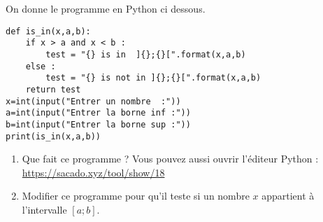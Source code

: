 
On donne le programme en Python ci dessous. 
 
\begin{lstlisting}
def is_in(x,a,b):
    if x > a and x < b :
    	test = "{} is in  ]{};{}[".format(x,a,b) 
    else :
        test = "{} is not in ]{};{}[".format(x,a,b) 
    return test    
x=int(input("Entrer un nombre  :")) 
a=int(input("Entrer la borne inf :"))
b=int(input("Entrer la borne sup :"))    
print(is_in(x,a,b))
\end{lstlisting}
 


\begin{enumerate}
\item Que fait ce programme ? Vous pouvez aussi ouvrir l'éditeur Python : \url{https://sacado.xyz/tool/show/18}
\item Modifier ce programme pour qu'il teste si un nombre $x$ appartient à l'intervalle $[a;b]$.
\end{enumerate}